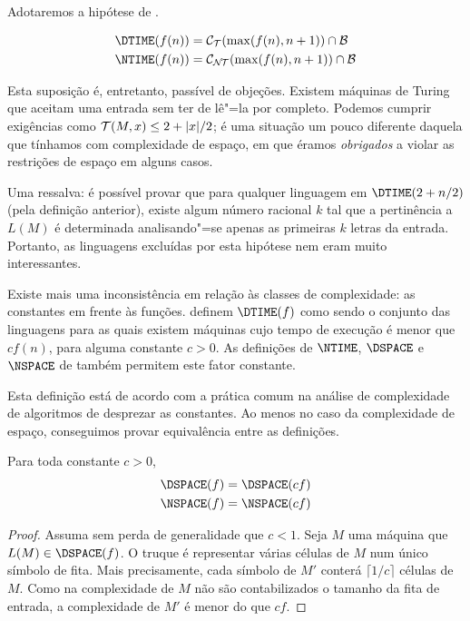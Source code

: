 Adotaremos a hipótese de .
\begin{definition}
    \begin{align*}
        \DTIME(f(n)) &= \mathcal C_\PhiDT(\max(f(n), n+1)) \cap \mathcal B \\
        \NTIME(f(n)) &= \mathcal C_\PhiNT(\max(f(n), n+1)) \cap \mathcal B
    \end{align*}
\end{definition}

Esta suposição é,
entretanto,
passível de objeções.
Existem máquinas de Turing
que aceitam uma entrada
sem ter de lê"=la por completo.
Podemos cumprir exigências como
${\mathcal{T}}(M, x) \leq 2 + |x|/2$;
é uma situação um pouco diferente
daquela que tínhamos com complexidade de espaço,
em que éramos \emph{obrigados}
a violar as restrições de espaço
em alguns casos.

Uma ressalva:
é possível provar que
para qualquer linguagem em $\DTIME(2 + n/2)$
(pela definição anterior),
existe algum número racional $k$ tal que
a pertinência a $L(M)$
é determinada analisando"=se
apenas as primeiras $k$ letras da entrada.
Portanto, as linguagens excluídas por esta hipótese
nem eram muito interessantes.

Existe mais uma inconsistência
em relação às classes de complexidade:
as constantes em frente às funções.
definem $\DTIME(f)$ como sendo o conjunto das linguagens
para as quais existem máquinas cujo tempo de execução
é menor que $c f(n)$, para alguma constante $c > 0$.
As definições de $\NTIME$, $\DSPACE$ e $\NSPACE$
de 
também permitem este fator constante.

Esta definição está de acordo com
a prática comum na análise de complexidade de algoritmos
de desprezar as constantes.
Ao menos no caso da complexidade de espaço,
conseguimos provar equivalência entre as definições.

\begin{theorem}
    Para toda constante $c > 0$,
    \begin{align*}
        \DSPACE(f) & = \DSPACE(cf) \\
        \NSPACE(f) & = \NSPACE(cf)
    \end{align*}
\end{theorem}

\begin{proof}
    Assuma sem perda de generalidade que $c < 1$.
    Seja $M$ uma máquina que $L(M) \in \DSPACE(f)$.
    O truque é representar várias células de $M$
    num único símbolo de fita.
    Mais precisamente,
    cada símbolo de $M'$ conterá
    $\lceil 1/c \rceil$ células de $M$.
    Como na complexidade de $M$
    não são contabilizados o tamanho da fita de entrada,
    a complexidade de $M'$ é menor do que $cf$.
\end{proof}

